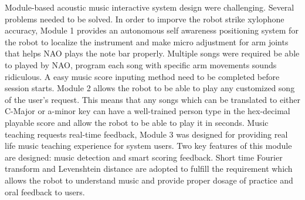 Module-based acoustic music interactive system design were challenging. Several problems needed
to be solved. In order to imporve the robot strike xylophone accuracy, Module 1 provides an autonomous 
self awareness positioning system for the robot to localize the instrument and make micro adjustment 
for arm joints that helps NAO plays the note bar properly. Multiple songs were required be able to 
played by NAO, program each song with specific arm movements sounds ridiculous. A easy music score
inputing method need to be completed before session starts. Module 2 allows the robot to be able 
to play any customized song of the user's request. This means that any songs which can be translated 
to either C-Major or a-minor key can have a well-trained person type in the hex-decimal playable 
score and allow the robot to be able to play it in seconds. Music teaching requests real-time feedback,
Module 3 was designed for providing real life music teaching experience for system users. Two key features
of this module are designed: music detection and smart scoring feedback. Short time Fourier transform
and Levenshtein distance are adopted to fulfill the requirement which allows the robot to understand
music and provide proper dosage of practice and oral feedback to users.\\


